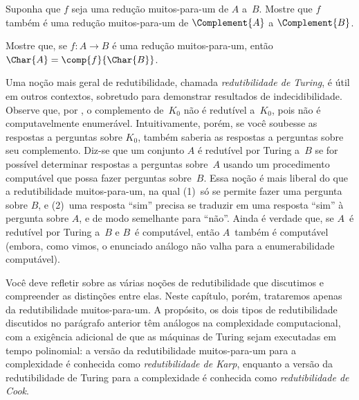 \documentclass[../../../include/open-logic-section]{subfiles}
\begin{document}
\begin{prob}
Suponha que $f$ seja uma redução muitos-para-um de $A$ a~$B$. Mostre
que $f$ também é uma redução muitos-para-um de $\Complement{A}$ a
$\Complement{B}$.
\end{prob}

\begin{prob}
Mostre que, se $f\colon A \to B$ é uma redução muitos-para-um, então
$\Char{A} = \comp{f}{\Char{B}}$.
\end{prob}

\begin{digress}
Uma noção mais geral de redutibilidade, chamada \emph{redutibilidade
de Turing}, é útil em outros contextos, sobretudo para demonstrar
resultados de indecidibilidade. Observe que, por
, o complemento de~$K_0$ não é redutível a~$K_0$,
pois não é computavelmente enumerável. Intuitivamente, porém, se você
soubesse as respostas a perguntas sobre $K_0$, também saberia as
respostas a perguntas sobre seu complemento. Diz-se que um conjunto
$A$ é redutível por Turing a~$B$ se for possível determinar respostas
a perguntas sobre~$A$ usando um procedimento computável que possa
fazer perguntas sobre~$B$. Essa noção é mais liberal do que a
redutibilidade muitos-para-um, na qual (1)~só se permite fazer uma
pergunta sobre $B$, e (2)~uma resposta ``sim'' precisa se traduzir em uma
resposta ``sim'' à pergunta sobre $A$, e de modo semelhante para
``não''. Ainda é verdade que, se $A$~é redutível por Turing a~$B$ e
$B$~é computável, então $A$~também é computável (embora, como vimos,
o enunciado análogo não valha para a enumerabilidade computável).

Você deve refletir sobre as várias noções de redutibilidade que
discutimos e compreender as distinções entre elas. Neste capítulo,
porém, trataremos apenas da redutibilidade muitos-para-um. A propósito,
os dois tipos de redutibilidade discutidos no parágrafo anterior têm
análogos na complexidade computacional, com a exigência adicional de
que as máquinas de Turing sejam executadas em tempo polinomial: a
versão da redutibilidade muitos-para-um para a complexidade é conhecida
como \emph{redutibilidade de Karp}, enquanto a versão da redutibilidade
de Turing para a complexidade é conhecida como \emph{redutibilidade de
Cook}.
\end{digress}
\end{document}
